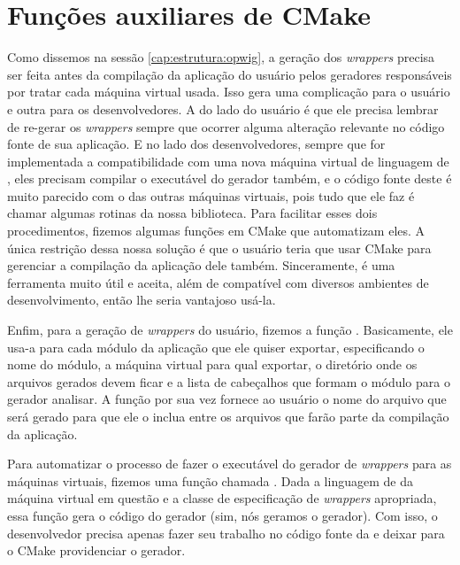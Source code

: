   \section{Funções auxiliares de CMake}
  \label{cap:atividades:cmake}
  
    Como dissemos na sessão \ref{cap:estrutura:opwig}, a geração dos
    \textit{wrappers} precisa ser feita antes da compilação da aplicação do
    usuário pelos geradores responsáveis por tratar cada máquina virtual usada.
    Isso gera uma complicação para o usuário e outra para os desenvolvedores. A
    do lado do usuário é que ele precisa lembrar de re-gerar os
    \textit{wrappers} sempre que ocorrer alguma alteração relevante no código
    fonte de sua aplicação. E no lado dos desenvolvedores, sempre que for
    implementada a compatibilidade com uma nova máquina virtual de linguagem de
    \script{}, eles precisam compilar o executável do gerador também, e o código
    fonte deste é muito parecido com o das outras máquinas virtuais, pois tudo
    que ele faz é chamar algumas rotinas da nossa biblioteca. Para facilitar
    esses dois procedimentos, fizemos algumas funções em CMake que automatizam
    eles. A única restrição dessa nossa solução é que o usuário teria que usar
    CMake para gerenciar a compilação da aplicação dele também. Sinceramente, é
    uma ferramenta muito útil e aceita, além de compatível com diversos ambientes
    de desenvolvimento, então lhe seria vantajoso usá-la.
    
    Enfim, para a geração de \textit{wrappers} do usuário, fizemos a função
    . Basicamente, ele usa-a para cada módulo
    da aplicação que ele quiser exportar, especificando o nome do módulo, a
    máquina virtual para qual exportar, o diretório onde os arquivos gerados
    devem ficar e a lista de cabeçalhos que formam o módulo para o gerador
    analisar. A função por sua vez fornece ao usuário o nome do arquivo que
    será gerado para que ele o inclua entre os arquivos que farão parte da
    compilação da aplicação.

    Para automatizar o processo de fazer o executável do gerador de
    \textit{wrappers} para as máquinas virtuais, fizemos uma função chamada
    . Dada a linguagem de \script{} da
    máquina virtual em questão e a classe de especificação de \textit{wrappers}
    apropriada, essa função gera o código do gerador (sim, nós geramos o
    gerador). Com isso, o desenvolvedor precisa apenas fazer seu trabalho no
    código fonte da  e deixar para o CMake providenciar o
    gerador.




















